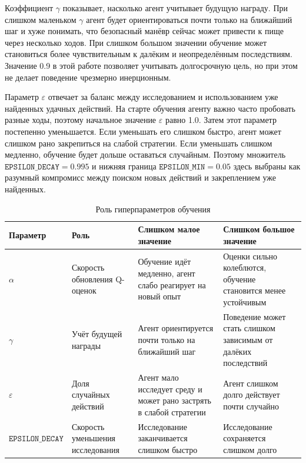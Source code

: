 Коэффициент $\gamma$ показывает, насколько агент учитывает будущую награду. При слишком маленьком $\gamma$ агент будет ориентироваться почти только на ближайший шаг и хуже понимать, что безопасный манёвр сейчас может привести к пище через несколько ходов. При слишком большом значении обучение может становиться более чувствительным к далёким и неопределённым последствиям. Значение 0.9 в этой работе позволяет учитывать долгосрочную цель, но при этом не делает поведение чрезмерно инерционным.

Параметр $\varepsilon$ отвечает за баланс между исследованием и использованием уже найденных удачных действий. На старте обучения агенту важно часто пробовать разные ходы, поэтому начальное значение $\varepsilon$ равно 1.0. Затем этот параметр постепенно уменьшается. Если уменьшать его слишком быстро, агент может слишком рано закрепиться на слабой стратегии. Если уменьшать слишком медленно, обучение будет дольше оставаться случайным. Поэтому множитель $\texttt{EPSILON\_DECAY}=0.995$ и нижняя граница $\texttt{EPSILON\_MIN}=0.05$ здесь выбраны как разумный компромисс между поиском новых действий и закреплением уже найденных.

\begin{table}[H]
    \centering
    \caption{Роль гиперпараметров обучения}
    \begin{tabularx}{\textwidth}{>{\raggedright\arraybackslash}p{} >{\raggedright\arraybackslash}p{} X X}
        \toprule
        Параметр & Роль & Слишком малое значение & Слишком большое значение \\
        \midrule
        $\alpha$ & Скорость обновления Q-оценок & Обучение идёт медленно, агент слабо реагирует на новый опыт & Оценки сильно колеблются, обучение становится менее устойчивым \\
        $\gamma$ & Учёт будущей награды & Агент ориентируется почти только на ближайший шаг & Поведение может стать слишком зависимым от далёких последствий \\
        $\varepsilon$ & Доля случайных действий & Агент мало исследует среду и может рано застрять в слабой стратегии & Агент слишком долго действует почти случайно \\
        $\texttt{EPSILON\_DECAY}$ & Скорость уменьшения исследования & Исследование заканчивается слишком быстро & Исследование сохраняется слишком долго \\
        \bottomrule
    \end{tabularx}
\end{table}

